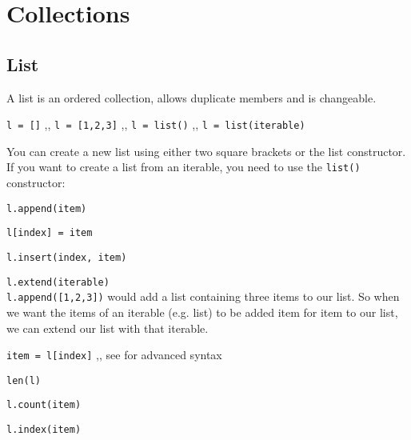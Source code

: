 \section{Collections}

    \subsection{List} \label{List}
        A list is an ordered collection, allows duplicate members and is changeable.

        \begin{itemize}
         \texttt{l = []} \sep{,} \texttt{l = [1,2,3]}
        \sep{,} \texttt{l = list()} \sep{,} \texttt{l = list(iterable)}

        You can create a new list using either two square brackets or the list constructor.
        If you want to create a list from an iterable, you need to use the
        \texttt{list()} constructor:


         \texttt{l.append(item)}

         \texttt{l[index] = item}

         \texttt{l.insert(index, item)}

         \texttt{l.extend(iterable)} \\
        \texttt{l.append([1,2,3])} would add a list containing three items to our list.
        So when we want the items of an iterable (e.g. list) to be added item for item to our list,
        we can extend our list with that iterable.


         \texttt{item = l[index]} \sep{,}
        see  for advanced syntax

         \texttt{len(l)}

         \texttt{l.count(item)}

         \texttt{l.index(item)}


\end{itemize}
